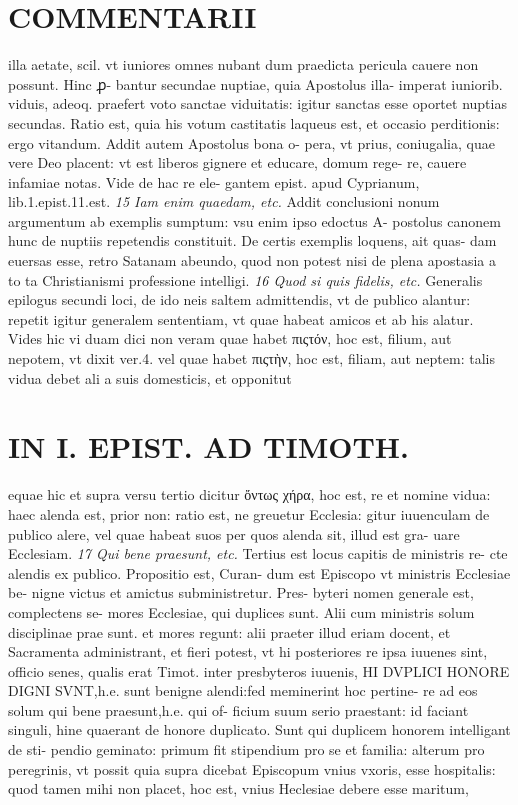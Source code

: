 \documentclass{article}
\begin{document}
\begin{pages}
\section*{COMMENTARII }
\marginpar{[ p.130 ]}\pstart illa aetate, scil. vt iuniores omnes nubant dum praedicta pericula cauere non possunt. Hinc ꝓ- bantur secundae nuptiae, quia Apostolus illa- imperat iuniorib. viduis, adeoq. praefert voto sanctae viduitatis: igitur sanctas esse oportet nuptias secundas. Ratio est, quia his votum castitatis laqueus est, et occasio perditionis: ergo vitandum. Addit autem Apostolus bona o- pera, vt prius, coniugalia, quae vere Deo placent: vt est liberos gignere et educare, domum rege- re, cauere infamiae notas. Vide de hac re ele- gantem epist. apud Cyprianum, lib.1.epist.11.est.  \pend
\textit{15 Iam enim quaedam, etc. }\pstart Addit conclusioni nonum argumentum ab exemplis sumptum: vsu enim ipso edoctus A- postolus canonem hunc de nuptiis repetendis constituit. De certis exemplis loquens, ait quas- dam euersas esse, retro Satanam abeundo, quod non potest nisi de plena apostasia a to ta Christianismi professione intelligi.  \pend
\textit{16 Quod si quis fidelis, etc. }\pstart Generalis epilogus secundi loci, de ido neis saltem admittendis, vt de publico alantur: repetit igitur generalem sententiam, vt quae habeat amicos et ab his alatur. Vides hic vi duam dici non veram quae habet πιςτόν, hoc est, filium, aut nepotem, vt dixit ver.4. vel quae habet πιςτὴν, hoc est, filiam, aut neptem: talis vidua debet ali a suis domesticis, et opponitut  \pend
\section*{IN I. EPIST. AD TIMOTH. }
\marginpar{[ p.131 ]}\pstart equae hic et supra versu tertio dicitur ὄντως χήρα, hoc est, re et nomine vidua: haec alenda est, prior non: ratio est, ne greuetur Ecclesia: gitur iuuenculam de publico alere, vel quae habeat suos per quos alenda sit, illud est gra- uare Ecclesiam.  \pend
\textit{17 Qui bene praesunt, etc. }\pstart Tertius est locus capitis de ministris re- cte alendis ex publico. Propositio est, Curan- dum est Episcopo vt ministris Ecclesiae be- nigne victus et amictus subministretur. Pres- byteri nomen generale est, complectens se- mores Ecclesiae, qui duplices sunt.  \pend\pstart Alii cum ministris solum disciplinae prae sunt. et mores regunt: alii praeter illud eriam docent, et Sacramenta administrant, et fieri potest, vt hi posteriores re ipsa iuuenes sint, officio senes, qualis erat Timot. inter presbyteros iuuenis, HI DVPLICI HONORE DIGNI SVNT,h.e. sunt benigne alendi:fed meminerint hoc pertine- re ad eos solum qui bene praesunt,h.e. qui of- ficium suum serio praestant: id faciant singuli, hine quaerant de honore duplicato.  \pend\pstart Sunt qui duplicem honorem intelligant de sti- pendio geminato: primum fit stipendium pro se et familia: alterum pro peregrinis, vt possit quia supra dicebat Episcopum vnius vxoris, esse hospitalis: quod tamen mihi non placet, hoc est, vnius Heclesiae debere esse maritum,  \pend

\end{pages}
\end{document}
